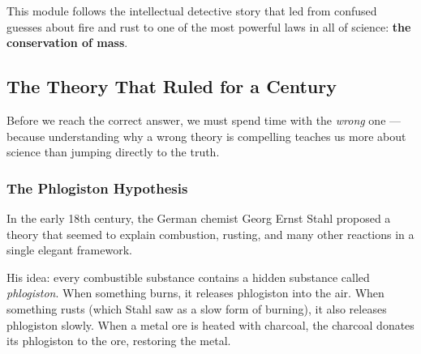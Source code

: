 \documentclass[12pt, a4paper]{book}
\theoremstyle{definition}
\newcommand{\newterm}[1]{\textit{\textcolor{DiscoveryColor}{#1}}}
\begin{document}
\vspace{0.5em}

This module follows the intellectual detective story
that led from confused guesses about fire and rust
to one of the most powerful laws in all of science:
\textbf{the conservation of mass}.

\subsection{The Theory That Ruled for a Century}

Before we reach the correct answer, we must spend time with
the \emph{wrong} one — because understanding why a wrong theory
is compelling teaches us more about science than jumping
directly to the truth.

\subsubsection{The Phlogiston Hypothesis}

In the early 18th century, the German chemist Georg Ernst Stahl
proposed a theory that seemed to explain combustion, rusting,
and many other reactions in a single elegant framework.

His idea: every combustible substance contains a hidden substance
called \newterm{phlogiston}.
When something burns, it releases phlogiston into the air.
When something rusts (which Stahl saw as a slow form of burning),
it also releases phlogiston slowly.
When a metal ore is heated with charcoal, the charcoal
donates its phlogiston to the ore, restoring the metal.
\end{document}

